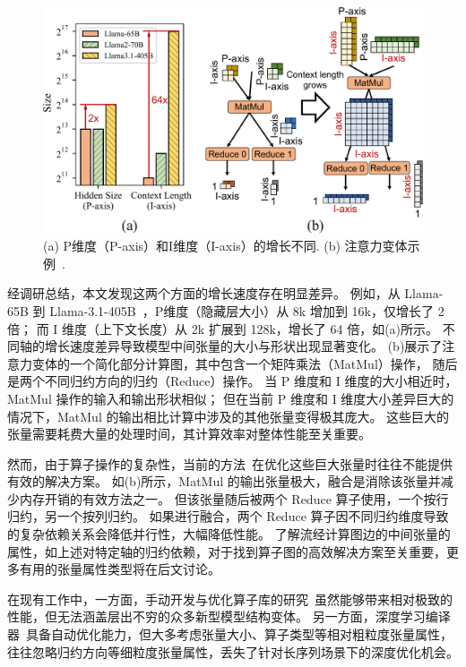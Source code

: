 \begin{figure}[ht]
    \centering
    \includegraphics[width=0.6\linewidth]{figures/flashtensor/intro_workload-crop.pdf}
    \caption{(a) P维度（P-axis）和I维度（I-axis）的增长不同. (b) 注意力变体示例~\cite{zhang2024h2o}.}
    \label{fig:flashtensor-larger_workload}
\end{figure}

经调研总结，本文发现这两个方面的增长速度存在明显差异。
例如，从 Llama-65B 到 Llama-3.1-405B~\cite{touvron2023llama, touvron2023llama2, dubey2024llama3}，P维度（隐藏层大小）从 8k 增加到 16k，仅增长了 2 倍；
而 I 维度（上下文长度）从 2k 扩展到 128k，增长了 64 倍，如(a)所示。
不同轴的增长速度差异导致模型中间张量的大小与形状出现显著变化。
(b)展示了注意力变体的一个简化部分计算图，其中包含一个矩阵乘法（MatMul）操作，
随后是两个不同归约方向的归约（Reduce）操作。
当 P 维度和 I 维度的大小相近时，MatMul 操作的输入和输出形状相似；
但在当前 P 维度和 I 维度大小差异巨大的情况下，MatMul 的输出相比计算中涉及的其他张量变得极其庞大。
这些巨大的张量需要耗费大量的处理时间，其计算效率对整体性能至关重要。

然而，由于算子操作的复杂性，当前的方法~\cite{tensorrt, torchcompile, zheng2023einnet, chen2018tvm, hu2024korch}在优化这些巨大张量时往往不能提供有效的解决方案。
如(b)所示，MatMul 的输出张量极大，融合是消除该张量并减少内存开销的有效方法之一。
但该张量随后被两个 Reduce 算子使用，一个按行归约，另一个按列归约。
如果进行融合，两个 Reduce 算子因不同归约维度导致的复杂依赖关系会降低并行性，大幅降低性能。
了解流经计算图边的中间张量的属性，如上述对特定轴的归约依赖，对于找到算子图的高效解决方案至关重要，更多有用的张量属性类型将在后文讨论。

在现有工作中，一方面，手动开发与优化算子库的研究~\cite{dao2022flashattention, dao2023flashattention, shah2024flashattention, flashinfer}虽然能够带来相对极致的性能，但无法涵盖层出不穷的众多新型模型结构变体。
另一方面，深度学习编译器~\cite{niu2021dnnfusion, astitch, shi2023welder}具备自动优化能力，但大多考虑张量大小、算子类型等相对粗粒度张量属性，往往忽略归约方向等细粒度张量属性，丢失了针对长序列场景下的深度优化机会。

